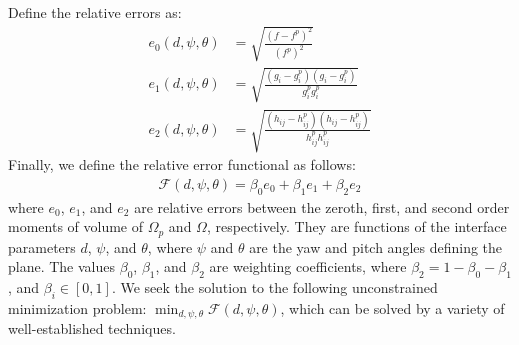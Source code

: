 Define the relative errors as:
\begin{align}
e_0(d,\psi,\theta) &=  \sqrt{\frac{(f - f^p)^2}{(f^p)^2}} \\
e_1(d,\psi,\theta) &=  \sqrt{\frac{(g_i - g_i^p)(g_i - g_i^p)}{g_i^{p}g_i^{p}}} \\
e_2(d,\psi,\theta) &=  \sqrt{\frac{(h_{ij} - h_{ij}^p)(h_{ij} - h_{ij}^p)}{h_{ij}^{p}h_{ij}^{p}}}
\end{align}
Finally, we define the relative error functional as follows:
\begin{align}
\mathcal{F}(d,\psi,\theta) = \beta_0e_0 + \beta_1e_1 + \beta_2e_2
\end{align}
where $e_0$, $e_1$, and $e_2$ are relative errors between the zeroth, first, and second order moments of volume of $\Omega_p$ and $\Omega$, respectively. They are functions of the interface parameters $d$, $\psi$, and $\theta$, where $\psi$ and $\theta$ are the yaw and pitch angles defining the plane. The values $\beta_0$, $\beta_1$, and $\beta_2$ are weighting coefficients, where $\beta_2 = 1 - \beta_0 - \beta_1$, and $\beta_i \in [0, 1]$. We seek the solution to the following unconstrained minimization problem: $\displaystyle \min_{d, \psi, \theta} \mathcal{F}(d,\psi,\theta)$, which can be solved by a variety of well-established techniques.

